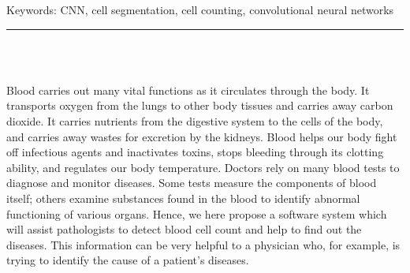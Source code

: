 \documentclass[12pt]{report}
\newenvironment{changemargin}[2]{%
\begin{list}{}{%
\setlength{\topsep}{0pt}%
\setlength{\leftmargin}{#1}%
\setlength{\rightmargin}{#2}%
\setlength{\listparindent}{\parindent}%
\setlength{\itemindent}{\parindent}%
\setlength{\parsep}{\parskip}%
}%
\item[]}{\end{list}}
\begin{document}
\vspace{1in}

\begin{changemargin}{0.9cm}{0.9cm}
Keywords: CNN, cell segmentation, cell counting, convolutional neural networks
\end{changemargin}

\newpage

\tableofcontents

\newpage

\listoffigures

\newpage

\listoftables



\newpage

\pagestyle{myfancy}

\vspace*{-0.2in}

\setcounter{page}{1}

\begin{center}
    {\color{Black} \rule{6.2in}{1.4mm} }\\
    \vspace{0.1in}
    \scshape{\fontsize{34}{46}{\bfseries{\color{Black}{General Introduction}}}}
    \\
    \vspace{0.5in}
\end{center}
\hspace*{0.16in}

Blood carries out many vital functions as it circulates through the body. It transports oxygen from the lungs to other body tissues and carries away carbon dioxide. It carries nutrients from the digestive system to the cells of the body, and carries away wastes for excretion by the kidneys. Blood helps our body fight off infectious agents and inactivates toxins, stops bleeding through its clotting ability, and regulates our body temperature. Doctors rely on many blood tests to diagnose and monitor diseases. Some tests measure the components of blood itself; others examine substances found in the blood to identify abnormal functioning of various organs. Hence, we here propose a software system which will assist pathologists to detect blood cell count and help to find out the diseases. This information can be very helpful to a physician who, for example, is trying to identify the cause of a patient's diseases.
\end{document}
